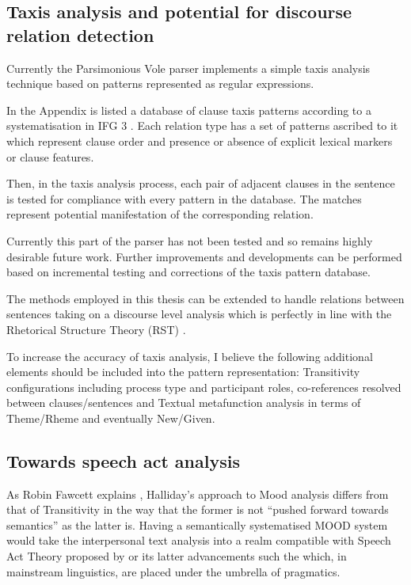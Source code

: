 \subsection{Taxis analysis and potential for discourse relation detection}
    Currently the Parsimonious Vole parser implements a simple taxis analysis technique based on patterns represented as regular expressions. 

    In the Appendix is listed a database of clause taxis patterns according to a systematisation in IFG 3 \citep{Halliday2004}. Each relation type has a set of patterns ascribed to it which represent clause order and presence or absence of explicit lexical markers or clause features. 

    Then, in the taxis analysis process, each pair of adjacent clauses in the sentence is tested for compliance with every pattern in the database. The matches represent potential manifestation of the corresponding relation.  

    Currently this part of the parser has not been tested and so remains highly desirable future work. Further improvements and developments can be performed based on incremental testing and corrections of the taxis pattern database.

    The methods employed in this thesis can be extended to handle relations between sentences taking on a discourse level analysis which is perfectly in line with the Rhetorical Structure Theory (RST) \citep{Mann1988,Mann1992}. 

    To increase the accuracy of taxis analysis, I believe the following additional elements should be included into the pattern representation: Transitivity configurations including process type and participant roles, co-references resolved between clauses/sentences and Textual metafunction analysis in terms of Theme/Rheme and eventually New/Given.

\subsection{Towards speech act analysis}
    As Robin Fawcett explains \citep{Fawcett2011}, Halliday's approach to Mood analysis differs from that of Transitivity in the way that the former is not ``pushed forward towards semantics'' as the latter is. Having a semantically systematised MOOD system would take the interpersonal text analysis into a realm compatible with Speech Act Theory proposed by \citet{Austin1975} or its latter advancements such the \citet{Searle1969} which, in mainstream linguistics, are placed under the umbrella of pragmatics. 

